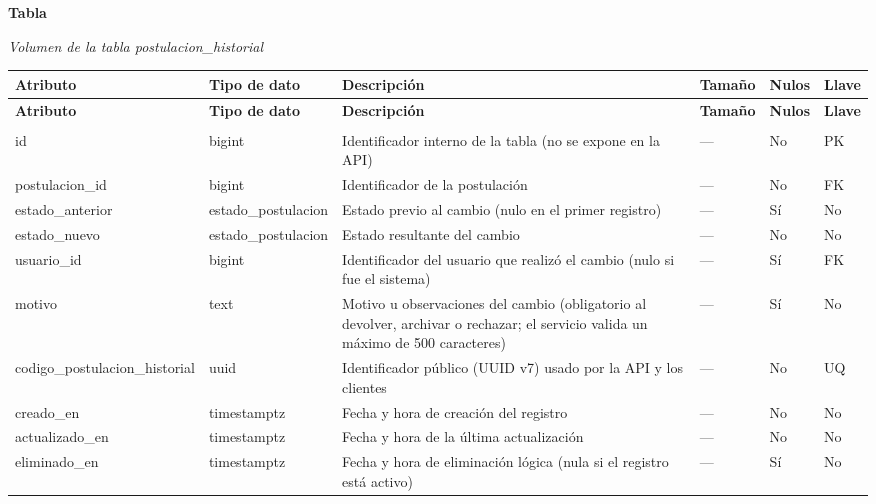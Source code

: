 \label{tab:volumen_postulacion_historial}
\noindent\textbf{Tabla~\thetable}\par\nopagebreak
\noindent\textit{Volumen de la tabla postulacion\_\allowbreak{}historial}\par\nopagebreak
\begingroup\small\linespread{1}\selectfont\setlength{\tabcolsep}{4pt}
\begin{longtable}{>{\raggedright\arraybackslash}p{3.4cm} >{\raggedright\arraybackslash}p{2.5cm} >{\raggedright\arraybackslash}p{4.8cm} >{\centering\arraybackslash}p{1.6cm}>{\centering\arraybackslash}p{1.1cm} >{\centering\arraybackslash}p{1.3cm}}
\toprule
\textbf{Atributo} & \textbf{Tipo de dato} & \textbf{Descripción} & \textbf{Tamaño} & \textbf{Nulos} & \textbf{Llave} \\
\midrule
\endfirsthead
\toprule
\textbf{Atributo} & \textbf{Tipo de dato} & \textbf{Descripción} & \textbf{Tamaño} & \textbf{Nulos} & \textbf{Llave} \\
\midrule
\endhead
\endfoot
\bottomrule
\multicolumn{6}{l}{\textit{Nota.} Elaboración propia.} \\
\endlastfoot
id & bigint & Identificador interno de la tabla (no se expone en la API) & — & No & PK \\
postulacion\_\allowbreak{}id & bigint & Identificador de la postulación & — & No & FK \\
estado\_\allowbreak{}anterior & estado\_\allowbreak{}postulacion & Estado previo al cambio (nulo en el primer registro) & — & Sí & No \\
estado\_\allowbreak{}nuevo & estado\_\allowbreak{}postulacion & Estado resultante del cambio & — & No & No \\
usuario\_\allowbreak{}id & bigint & Identificador del usuario que realizó el cambio (nulo si fue el sistema) & — & Sí & FK \\
motivo & text & Motivo u observaciones del cambio (obligatorio al devolver, archivar o rechazar; el servicio valida un máximo de 500 caracteres) & — & Sí & No \\
codigo\_\allowbreak{}postulacion\_\allowbreak{}historial & uuid & Identificador público (UUID v7) usado por la API y los clientes & — & No & UQ \\
creado\_\allowbreak{}en & timestamptz & Fecha y hora de creación del registro & — & No & No \\
actualizado\_\allowbreak{}en & timestamptz & Fecha y hora de la última actualización & — & No & No \\
eliminado\_\allowbreak{}en & timestamptz & Fecha y hora de eliminación lógica (nula si el registro está activo) & — & Sí & No \\
\end{longtable}
\endgroup
\addtocounter{table}{-1}


